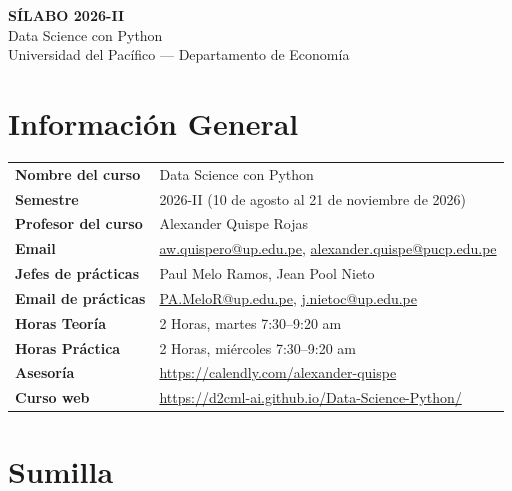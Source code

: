 \documentclass[11pt]{article}
\begin{document}
\begin{center}
{\Large\bfseries S\'ILABO 2026-II}\\[0.4em]
{\large Data Science con Python}\\[0.2em]
{\normalsize Universidad del Pac\'ifico --- Departamento de Econom\'ia}
\end{center}

\vspace{0.6em}

\section{Informaci\'on General}

\begin{tabular}{@{}p{4.2cm}p{11cm}@{}}
\textbf{Nombre del curso} & Data Science con Python \\
\textbf{Semestre} & 2026-II (10 de agosto al 21 de noviembre de 2026) \\
\textbf{Profesor del curso} & Alexander Quispe Rojas \\
\textbf{Email} & \href{mailto:aw.quispero@up.edu.pe}{aw.quispero@up.edu.pe}, \href{mailto:alexander.quispe@pucp.edu.pe}{alexander.quispe@pucp.edu.pe} \\
\textbf{Jefes de pr\'acticas} & Paul Melo Ramos, Jean Pool Nieto \\
\textbf{Email de pr\'acticas} & \href{mailto:PA.MeloR@up.edu.pe}{PA.MeloR@up.edu.pe}, \href{mailto:j.nietoc@up.edu.pe}{j.nietoc@up.edu.pe} \\
\textbf{Horas Teor\'ia} & 2 Horas, martes 7:30--9:20 am \\
\textbf{Horas Pr\'actica} & 2 Horas, mi\'ercoles 7:30--9:20 am \\
\textbf{Asesor\'ia} & \url{https://calendly.com/alexander-quispe} \\
\textbf{Curso web} & \url{https://d2cml-ai.github.io/Data-Science-Python/} \\
\end{tabular}

\section{Sumilla}
\end{document}
